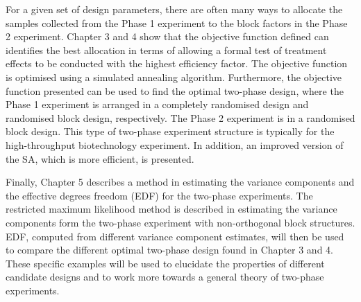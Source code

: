 \documentclass[11pt,a4paper]{article}
\begin{document}
For a given set of design parameters, there are often many ways to allocate the samples collected from the Phase 1 experiment to the block factors in the Phase 2 experiment. Chapter 3 and 4 show that the objective function defined can identifies the best allocation in terms of allowing a formal test of treatment effects to be conducted with the highest efficiency factor. The objective function is optimised using a simulated annealing algorithm. Furthermore, the objective function presented can be used to find the optimal two-phase design, where the Phase 1 experiment is arranged in a completely randomised design and randomised block design, respectively. The Phase 2 experiment is in a randomised block design. This type of two-phase experiment structure is typically for the high-throughput biotechnology experiment. In addition, an improved version of the SA, which is more efficient, is presented.

Finally, Chapter 5 describes a method in estimating the variance components and the effective degrees freedom (EDF) for the two-phase experiments. The restricted maximum likelihood method is described in estimating the variance components form the two-phase experiment with non-orthogonal block structures. EDF, computed from different variance component estimates, will then be used to compare the different optimal two-phase design found in Chapter 3 and 4. These specific examples will be used to elucidate the properties of different candidate designs and to work more towards a general theory of two-phase experiments.  




\end{document}
